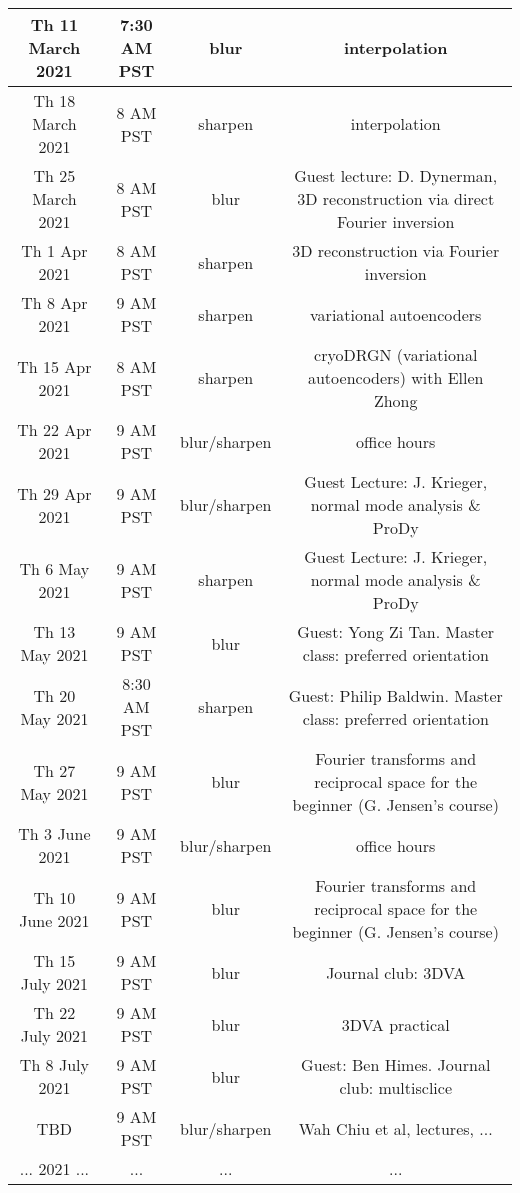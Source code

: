 \documentclass[11pt, oneside]{article}   	%
\begin{document}
\begin{center}
\begin{tabular}{|| c c c c||}
 \hline
Th 11 March 2021 & \tiny{7:30 AM PST} & blur & interpolation  \\ 
 \hline
 Th 18 March 2021 & \tiny{8 AM PST} & sharpen & interpolation  \\ 
 \hline
Th 25 March 2021 & \tiny{8 AM PST} & blur & \tiny{Guest lecture: D. Dynerman, 3D reconstruction via direct Fourier inversion}  \\ 
 \hline
Th 1 Apr 2021 & \tiny{8 AM PST} & sharpen & 3D reconstruction via  Fourier inversion  \\ 
 \hline
Th 8 Apr 2021 & \tiny{9 AM PST} & sharpen & variational autoencoders  \\ 
 \hline
Th 15 Apr 2021 & \tiny{8 AM PST} & sharpen & cryoDRGN (variational autoencoders) with Ellen Zhong  \\ 
 \hline
Th 22 Apr 2021 & \tiny{9 AM PST} & blur/sharpen & office hours  \\ 
 \hline
Th 29 Apr 2021 & \tiny{9 AM PST} & blur/sharpen & \tiny{Guest Lecture: J. Krieger, normal mode analysis \& ProDy}  \\ 
 \hline
Th 6 May 2021 & \tiny{9 AM PST} & sharpen & \tiny{Guest Lecture: J. Krieger, normal mode analysis \& ProDy} \\ 
 \hline
Th 13 May 2021 & \tiny{9 AM PST} & blur & \tiny{Guest: Yong Zi Tan. Master class: preferred orientation}  \\ 
 \hline
Th 20 May 2021 & \tiny{8:30 AM PST} & sharpen & \tiny{Guest: Philip Baldwin. Master class: preferred orientation}  \\ 
 \hline
Th 27 May 2021 & \tiny{9 AM PST} & blur & \tiny{Fourier transforms and reciprocal space for the beginner (G. Jensen's course)}  \\ 
 \hline
Th 3 June 2021 & \tiny{9 AM PST} & blur/sharpen & office hours  \\ 
 \hline
Th 10 June 2021 & \tiny{9 AM PST} & blur & \tiny{Fourier transforms and reciprocal space for the beginner (G. Jensen's course)}  \\
 \hline
Th 15 July 2021 & \tiny{9 AM PST} & blur & Journal club: 3DVA \\
 \hline
Th 22 July 2021 & \tiny{9 AM PST} & blur & 3DVA practical \\
 \hline
Th 8 July 2021 & \tiny{9 AM PST} & blur & Guest: Ben Himes. Journal club: multisclice  \\
 \hline
TBD & \tiny{9 AM PST} & blur/sharpen & Wah Chiu et al, lectures, ...  \\ [1ex] 
 \hline
 ... 2021 ... & ... &  ... & ...  \\ 
 \hline
\end{tabular}
\end{center}
\end{document}
